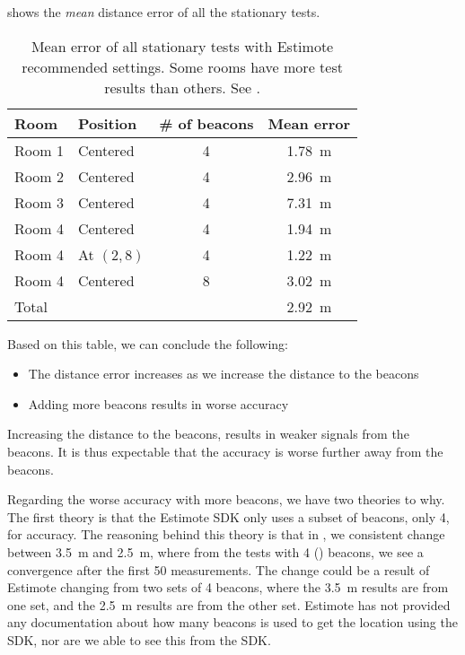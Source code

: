  shows the \emph{mean} distance error of all the stationary tests. 

\begin{table}[!htb]
  \centering
  \begin{tabular}{l|l c c}
    Room   & Position   & \# of beacons & Mean error \\ \hline
    Room 1 & Centered   & 4             & \SI{1.78}{\meter} \\
    Room 2 & Centered   & 4             & \SI{2.96}{\meter} \\
    Room 3 & Centered   & 4             & \SI{7.31}{\meter} \\
    Room 4 & Centered   & 4             & \SI{1.94}{\meter} \\
    Room 4 & At $(2,8)$ & 4             & \SI{1.22}{\meter} \\
    Room 4 & Centered   & 8             & \SI{3.02}{\meter} \\ \hline
    Total  &            &               & \SI{2.92}{\meter}
  \end{tabular}
  \caption{Mean error of all stationary tests with Estimote recommended settings. Some rooms have more test results than others. See .}
  \label{table:meanerrorresults}
\end{table}

Based on this table, we can conclude the following:
\begin{itemize}
  \item The distance error increases as we increase the distance to the beacons
  \item Adding more beacons results in worse accuracy
\end{itemize}

Increasing the distance to the beacons, results in weaker signals from the beacons. 
It is thus expectable that the accuracy is worse further away from the beacons. 

Regarding the worse accuracy with more beacons, 
we have two theories to why.
The first theory is that the Estimote SDK only uses a subset of beacons, \eg only \num{4}, for accuracy. 
The reasoning behind this theory is that in , 
we consistent change between \SI{3.5}{\meter} and \SI{2.5}{\meter}, 
where from the tests with \num{4} () beacons, 
we see a convergence after the first \num{50} measurements.
The change could be a result of Estimote changing from two sets of \num{4} beacons, 
where the \SI{3.5}{\meter} results are from one set, 
and the \SI{2.5}{\meter} results are from the other set. 
Estimote has not provided any documentation about how many beacons is used to get the location using the SDK, 
nor are we able to see this from the SDK. 

